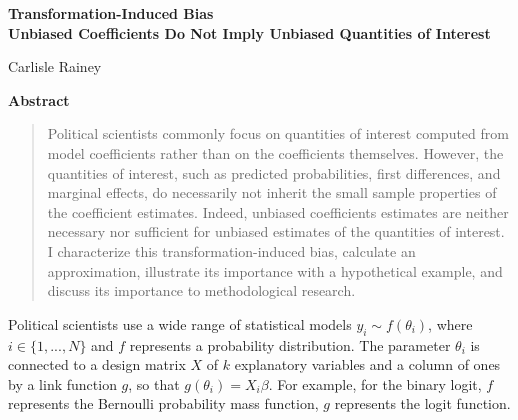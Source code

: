 \documentclass[12pt]{article}
\begin{document}
\begin{center}
{\LARGE \textbf{Transformation-Induced Bias}}\\\vspace{2mm}
{ \textbf{Unbiased Coefficients Do Not Imply Unbiased Quantities of Interest}}

\vspace{5mm}

Carlisle Rainey
\end{center}

\vspace{5mm}

{\centerline{\textbf{Abstract}}}
\begin{quote}\noindent
Political scientists commonly focus on quantities of interest computed from model coefficients rather than on the coefficients themselves. 
However, the quantities of interest, such as predicted probabilities, first differences, and marginal effects, do necessarily not inherit the small sample properties of the coefficient estimates. 
Indeed, unbiased coefficients estimates are neither necessary nor sufficient for unbiased estimates of the quantities of interest. 
I characterize this transformation-induced bias, calculate an approximation, illustrate its importance with a hypothetical example, and discuss its importance to methodological research.
 \end{quote}



\thispagestyle{empty}

\doublespace


Political scientists use a wide range of statistical models $y_i \sim f(\theta_i)$, where $i \in \{1,..., N\}$ and $f$ represents a probability distribution. 
The parameter $\theta_i$ is connected to a design matrix $X$ of $k$ explanatory variables and a column of ones by a link function $g$, so that $g(\theta_i) = X_i\beta$. 
For example, for the binary logit, $f$ represents the Bernoulli probability mass function, $g$ represents the logit function.
\end{document}
